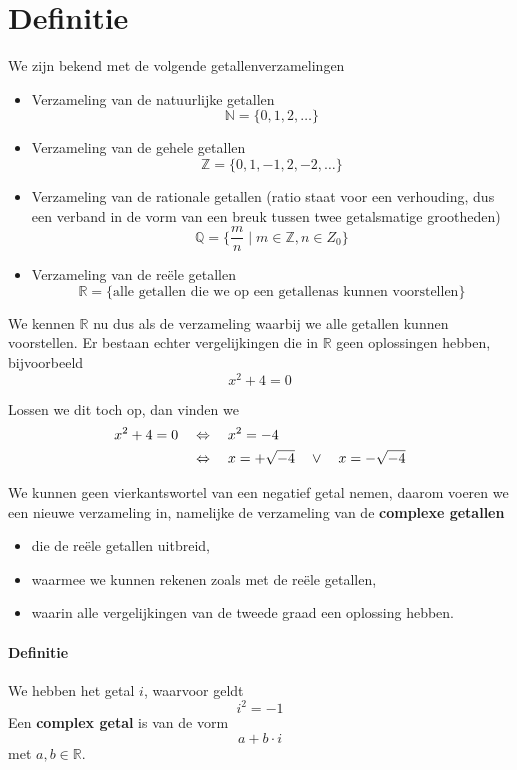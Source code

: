 \documentclass[12pt,twoside]{article}
\begin{document}
\section{Definitie}

We zijn bekend met de volgende getallenverzamelingen
\begin{itemize}
  \item Verzameling van de natuurlijke getallen
  $$\mathbb{N}=\{0, 1, 2, \ldots\}$$
  \item Verzameling van de gehele getallen
  $$\mathbb{Z}=\{0, 1, -1, 2, -2, \ldots\}$$
  \item Verzameling van de rationale getallen (ratio staat voor een verhouding, dus een verband in de vorm van een breuk tussen twee getalsmatige grootheden)
  $$\mathbb{Q}=\{\frac{m}{n}\;|\;m\in\mathbb{Z}, n\in{Z}_0\}$$
  \item Verzameling van de reële getallen
  $$\mathbb{R}=\{\mbox{alle getallen die we op een getallenas kunnen voorstellen}\}$$
\end{itemize}

We kennen $\mathbb{R}$ nu dus als de verzameling waarbij we alle getallen kunnen voorstellen. Er bestaan echter vergelijkingen die in $\mathbb{R}$ geen oplossingen hebben, bijvoorbeeld
$$x^2+4=0$$

Lossen we dit toch op, dan vinden we
\begin{align*}
  x^2+4=0 \quad & \Leftrightarrow\quad x^2 = -4\\
                & \Leftrightarrow\quad x = +\sqrt{-4} \quad\vee\quad x = -\sqrt{-4}
\end{align*}

We kunnen geen vierkantswortel van een negatief getal nemen, daarom voeren we een nieuwe verzameling in, namelijke de verzameling van de {\bf complexe getallen}
\begin{itemize}
  \item die de reële getallen uitbreid,
  \item waarmee we kunnen rekenen zoals met de reële getallen,
  \item waarin alle vergelijkingen van de tweede graad een oplossing hebben.
\end{itemize}

\pagebreak
\paragraph*{Definitie}
\begin{mdframed}
We hebben het getal $i$, waarvoor geldt
$$i^2=-1$$
Een {\bf complex getal} is van de vorm
$$a+b\cdot i$$
met $a,b\in \mathbb{R}$.
\end{mdframed}
\end{document}
